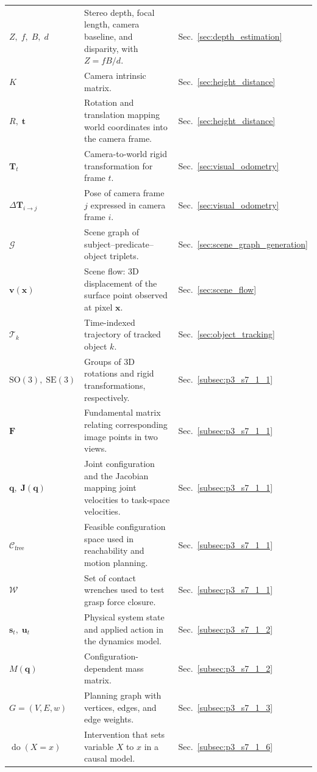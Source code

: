\begin{longtable}{lll}
$Z,\;f,\;B,\;d$ & Stereo depth, focal length, camera baseline, and disparity, with $Z=fB/d$. & Sec.~\ref{sec:depth_estimation} \\
$K$ & Camera intrinsic matrix. & Sec.~\ref{sec:height_distance} \\
$R,\;\mathbf{t}$ & Rotation and translation mapping world coordinates into the camera frame. & Sec.~\ref{sec:height_distance} \\
$\mathbf{T}_t$ & Camera-to-world rigid transformation for frame $t$. & Sec.~\ref{sec:visual_odometry} \\
$\Delta\mathbf{T}_{i\to j}$ & Pose of camera frame $j$ expressed in camera frame $i$. & Sec.~\ref{sec:visual_odometry} \\
$\mathcal{G}$ & Scene graph of subject--predicate--object triplets. & Sec.~\ref{sec:scene_graph_generation} \\
$\mathbf{v}(\mathbf{x})$ & Scene flow: 3D displacement of the surface point observed at pixel $\mathbf{x}$. & Sec.~\ref{sec:scene_flow} \\
$\mathcal{T}_k$ & Time-indexed trajectory of tracked object $k$. & Sec.~\ref{sec:object_tracking} \\
$\mathrm{SO}(3),\;\mathrm{SE}(3)$ & Groups of 3D rotations and rigid transformations, respectively. & Sec.~\ref{subsec:p3_s7_1_1} \\
$\mathbf{F}$ & Fundamental matrix relating corresponding image points in two views. & Sec.~\ref{subsec:p3_s7_1_1} \\
$\mathbf{q},\;\mathbf{J}(\mathbf{q})$ & Joint configuration and the Jacobian mapping joint velocities to task-space velocities. & Sec.~\ref{subsec:p3_s7_1_1} \\
$\mathcal{C}_{\mathrm{free}}$ & Feasible configuration space used in reachability and motion planning. & Sec.~\ref{subsec:p3_s7_1_1} \\
$\mathcal{W}$ & Set of contact wrenches used to test grasp force closure. & Sec.~\ref{subsec:p3_s7_1_1} \\
$\mathbf{s}_t,\;\mathbf{u}_t$ & Physical system state and applied action in the dynamics model. & Sec.~\ref{subsec:p3_s7_1_2} \\
$M(\mathbf{q})$ & Configuration-dependent mass matrix. & Sec.~\ref{subsec:p3_s7_1_2} \\
$G=(V,E,w)$ & Planning graph with vertices, edges, and edge weights. & Sec.~\ref{subsec:p3_s7_1_3} \\
$\operatorname{do}(X=x)$ & Intervention that sets variable $X$ to $x$ in a causal model. & Sec.~\ref{subsec:p3_s7_1_6} \\

\end{longtable}
